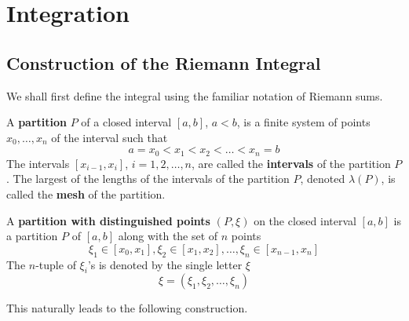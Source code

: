 \section{Integration}

\subsection{Construction of the Riemann Integral}

  We shall first define the integral using the familiar notation of Riemann sums. 

  \begin{definition}
    A \textbf{partition} $P$ of a closed interval $[a, b]$, $a < b$, is a finite system of points $x_0, \ldots, x_n$ of the interval such that
    \[a = x_0 < x_1 < x_2 < \ldots < x_n = b\]
    The intervals $[x_{i-1}, x_i]$, $i = 1, 2, \ldots, n$, are called the \textbf{intervals} of the partition $P$. The largest of the lengths of the intervals of the partition $P$, denoted $\lambda(P)$, is called the \textbf{mesh} of the partition. 

    A \textbf{partition with distinguished points} $(P, \xi)$ on the closed interval $[a, b]$ is a partition $P$ of $[a,b]$ along with the set of $n$ points 
    \[\xi_1 \in [x_0, x_1], \xi_2 \in [x_1, x_2], \ldots, \xi_n \in [x_{n-1}, x_n]\]
    The $n$-tuple of $\xi_i$'s is denoted by the single letter $\xi$
    \[\xi = (\xi_1, \xi_2, \ldots, \xi_n)\]
  \end{definition}

  This naturally leads to the following construction. 

